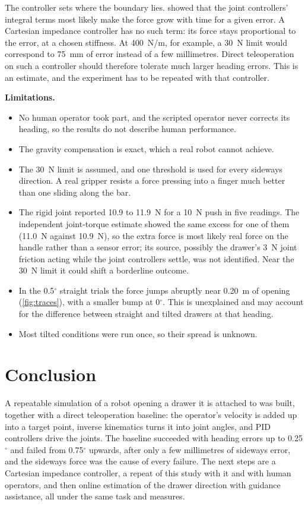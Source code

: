 \documentclass[11pt,a4paper]{article}
\begin{document}
The controller sets where the boundary lies.  showed that the joint
controllers' integral terms most likely make the force grow with time for a given error. A
Cartesian impedance controller \cite{hogan1985impedance,khatib1987unified} has no such term: its
force stays proportional to the error, at a chosen stiffness. At 400~N/m, for example, a 30~N limit
would correspond to 75~mm of error instead of a few millimetres. Direct teleoperation on such a
controller should therefore tolerate much larger heading errors. This is an estimate, and the
experiment has to be repeated with that controller.

\textbf{Limitations.}
\begin{itemize}
\item No human operator took part, and the scripted operator never corrects its heading, so the
  results do not describe human performance.
\item The gravity compensation is exact, which a real robot cannot achieve.
\item The 30~N limit is assumed, and one threshold is used for every sideways direction. A real
  gripper resists a force pressing into a finger much better than one sliding along the bar.
\item The rigid joint reported 10.9 to 11.9~N for a 10~N push in five readings. The independent
  joint-torque estimate showed the same excess for one of them (11.0~N against 10.9~N), so the
  extra force is most likely real force on the handle rather than a sensor error; its source,
  possibly the drawer's 3~N joint friction acting while the joint controllers settle, was not
  identified. Near the 30~N limit it could shift a borderline outcome.
\item In the 0.5$^\circ$ straight trials the force jumps abruptly near 0.20~m of opening
  (\cref{fig:traces}), with a smaller bump at 0$^\circ$. This is unexplained and may account for the
  difference between straight and tilted drawers at that heading.
\item Most tilted conditions were run once, so their spread is unknown.
\end{itemize}

\section{Conclusion}\label{sec:conclusion}

A repeatable simulation of a robot opening a drawer it is attached to was built, together with a
direct teleoperation baseline: the operator's velocity is added up into a target point, inverse
kinematics turns it into joint angles, and PID controllers drive the joints. The baseline
succeeded with heading errors up to 0.25$^\circ$ and failed from 0.75$^\circ$ upwards, after only a
few millimetres of sideways error, and the sideways force was the cause of every failure. The
next steps are a Cartesian impedance controller, a repeat of this study with it and with human
operators, and then online estimation of the drawer direction with guidance assistance, all
under the same task and measures.
\end{document}
